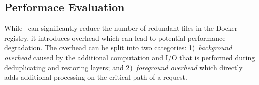 \subsection{Performace Evaluation}


While \sysname\ can significantly reduce the number of redundant files in the
Docker registry, it introduces overhead which can lead to potential performance
degradation.
%
The overhead can be split into two categories: 1)~\emph{background overhead} caused
by the additional computation and I/O that is performed during deduplicating and
restoring layers; and 2)~\emph{foreground overhead} which directly adds additional
processing on the critical path of a request.
%


